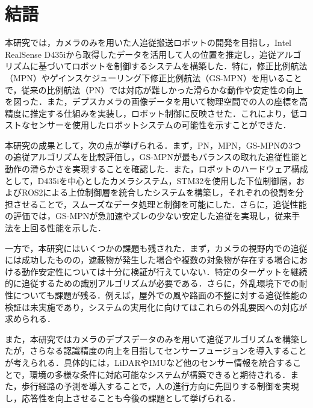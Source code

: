 \section{結語}
本研究では，カメラのみを用いた人追従搬送ロボットの開発を目指し，Intel RealSense D435iから取得したデータを活用して人の位置を推定し，追従アルゴリズムに基づいてロボットを制御するシステムを構築した．特に，修正比例航法（MPN）やゲインスケジューリング下修正比例航法（GS-MPN）を用いることで，従来の比例航法（PN）では対応が難しかった滑らかな動作や安定性の向上を図った．また，デプスカメラの画像データを用いて物理空間での人の座標を高精度に推定する仕組みを実装し，ロボット制御に反映させた．これにより，低コストなセンサーを使用したロボットシステムの可能性を示すことができた．

本研究の成果として，次の点が挙げられる．まず，PN，MPN，GS-MPNの3つの追従アルゴリズムを比較評価し，GS-MPNが最もバランスの取れた追従性能と動作の滑らかさを実現することを確認した．また，ロボットのハードウェア構成として，D435iを中心としたカメラシステム，STM32を使用した下位制御層，およびROS2による上位制御層を統合したシステムを構築し，それぞれの役割を分担させることで，スムーズなデータ処理と制御を可能にした．さらに，追従性能の評価では，GS-MPNが急加速やズレの少ない安定した追従を実現し，従来手法を上回る性能を示した．

一方で，本研究にはいくつかの課題も残された．まず，カメラの視野内での追従には成功したものの，遮蔽物が発生した場合や複数の対象物が存在する場合における動作安定性については十分に検証が行えていない．特定のターゲットを継続的に追従するための識別アルゴリズムが必要である．さらに，外乱環境下での耐性についても課題が残る．例えば，屋外での風や路面の不整に対する追従性能の検証は未実施であり，システムの実用化に向けてはこれらの外乱要因への対応が求められる．

また，本研究ではカメラのデプスデータのみを用いて追従アルゴリズムを構築したが，さらなる認識精度の向上を目指してセンサーフュージョンを導入することが考えられる．具体的には，LiDARやIMUなど他のセンサー情報を統合することで，環境の多様な条件に対応可能なシステムが構築できると期待される．また，歩行経路の予測を導入することで，人の進行方向に先回りする制御を実現し，応答性を向上させることも今後の課題として挙げられる．
